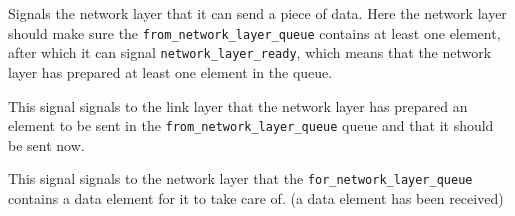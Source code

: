 %
%

\begin{description}[leftmargin=1em, style=nextline]
\item [\texttt{network\_layer\_allowed\_to\_send}] Signals the network layer that it can send a piece of data.
Here the network layer should make sure the \texttt{from\_network\_layer\_queue}
contains at least one element, after which it can signal \texttt{network\_layer\_ready},
which means that the network layer has prepared at least one element in the queue.

\item [\texttt{network\_layer\_ready}] This signal signals to the link layer that the network layer has prepared an element to be sent in the
  \texttt{from\_network\_layer\_queue} queue and that it should be sent now.

\item [\texttt{data\_for\_network\_layer}]
This signal signals to the network layer that the
\texttt{for\_network\_layer\_queue} contains a data element for it to take care of. (a data element has been received)
\end{description}

\hfill \break
